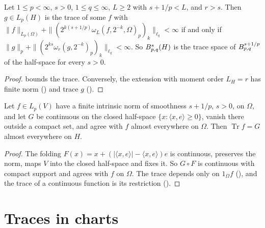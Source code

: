 \begin{theorem}
\label{thm:half-space-trace-space}
\leanok
{}
Let $1 \leq p < \infty$, $s > 0$, $1 \leq q \leq \infty$, $L \geq 2$ with $s + 1/p < L$, and
$r > s$. Then $g \in L_p(H)$ is the trace of some $f$ with
$\|f\|_{L_p(\Omega)} + \|(2^{k(s+1/p)} \omega_L(f, 2^{-k}, \Omega)_p)_k\|_{\ell_q} < \infty$ if and
only if $\|g\|_p + \|(2^{ks} \omega_r(g, 2^{-k})_p)_k\|_{\ell_q} < \infty$. So
$B^{s}_{p,q}(H)$ is the trace space of $B^{s + 1/p}_{p,q}$ of the half-space for every
$s > 0$.
\end{theorem}

\begin{proof}
\leanok
{} bounds the trace. Conversely, the extension with moment order
$L_H = r$ has finite norm () and trace $g$
().
\end{proof}

\begin{lemma}
\label{lem:trace-continuous-half-space}
\leanok
{}
Let $f \in L_p(V)$ have a finite intrinsic norm of smoothness $s + 1/p$, $s > 0$, on $\Omega$, and
let $G$ be continuous on the closed half-space $\{x : \langle x, e \rangle \geq 0\}$, vanish there
outside a compact set, and agree with $f$ almost everywhere on $\Omega$. Then
$\operatorname{Tr} f = G$ almost everywhere on $H$.
\end{lemma}

\begin{proof}
\leanok
The folding $F(x) = x + (|\langle x, e \rangle| - \langle x, e \rangle) e$ is continuous, preserves
the norm, maps $V$ into the closed half-space and fixes it. So $G \circ F$ is continuous with
compact support and agrees with $f$ on $\Omega$. The trace depends only on $1_\Omega f$
(), and the trace of a continuous function is its restriction
().
\end{proof}

\section{Traces in charts}

